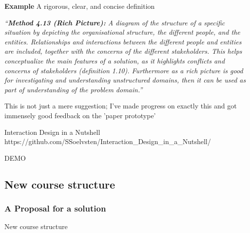 
\begin{frame}
  \textbf{Example} A rigorous, clear, and concise definition

  \medskip
  
  {\small \it 
    ``\textbf{Method 4.13 (Rich Picture): } A diagram of the structure of a
specific situation by depicting the organisational structure, the different
people, and the entities. Relationships and interactions between the different
people and entities are included, together with the concerns of the different
stakeholders. This helps conceptualize the main features of a solution, as it
highlights conflicts and concerns of stakeholders (definition 1.10). Furthermore
as a rich picture is good for investigating and understanding unstructured
domains, then it can be used as part of \emph{understanding} of the
problem domain.''}
\end{frame}


\begin{frame}
  This is not just a mere suggestion; I've made progress on exactly this and got
  immensely good feedback on the 'paper prototype'

  \medskip

  \begin{block}{Interaction Design in a Nutshell}
    https://github.com/SSoelvsten/Interaction\_Design\_in\_a\_Nutshell/
  \end{block}
  
  \medskip

  \Huge{\centerline{DEMO}}
\end{frame}


\subsection{New course structure}
\begin{frame}
  \frametitle{A Proposal for a solution}
  \Huge{\centerline{New course structure}}
\end{frame}



